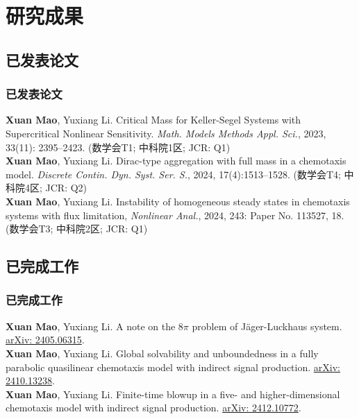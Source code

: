 \section{研究成果}
\subsection{已发表论文}

\begin{frame}
  \frametitle{已发表论文}
  \textbf{Xuan Mao}, Yuxiang Li.
  Critical Mass for Keller-Segel Systems with Supercritical Nonlinear Sensitivity. 
  \emph{Math. Models Methods Appl. Sci.}, 2023, 33(11): 2395--2423.
  \hfill (数学会T1; 中科院1区; JCR: Q1)\\
  \textbf{Xuan Mao}, Yuxiang Li. 
  Dirac-type aggregation with full mass in a chemotaxis model. 
  \emph{Discrete Contin. Dyn. Syst. Ser. S.}, 2024, 17(4):1513--1528. 
  \hfill (数学会T4; 中科院4区; JCR: Q2)\\
  \textbf{Xuan Mao}, Yuxiang Li. 
  Instability of homogeneous steady states in chemotaxis systems with flux limitation, 
  \emph{Nonlinear Anal.}, 2024, 243: Paper No. 113527, 18.
  \hfill (数学会T3; 中科院2区; JCR: Q1)
  \end{frame}

\subsection{已完成工作}

\begin{frame}
  \frametitle{已完成工作}
  \textbf{Xuan Mao}, Yuxiang Li. 
  A note on the $8\pi$ problem of J\"ager-Luckhaus system.
  \href{https://doi.org/10.48550/arXiv.2405.06315}
  {arXiv: 2405.06315}.\\ 
  \textbf{Xuan Mao}, Yuxiang Li.
  Global solvability and unboundedness in a fully parabolic quasilinear chemotaxis model with indirect signal production.
  \href{https://arxiv.org/abs/2410.13238}
  {arXiv: 2410.13238}.\\
  \textbf{Xuan Mao}, Yuxiang Li. Finite-time blowup in a five- and higher-dimensional chemotaxis model with indirect signal production. %
\href{https://arxiv.org/pdf/2412.10772}{arXiv: 2412.10772}.\\
\end{frame}

